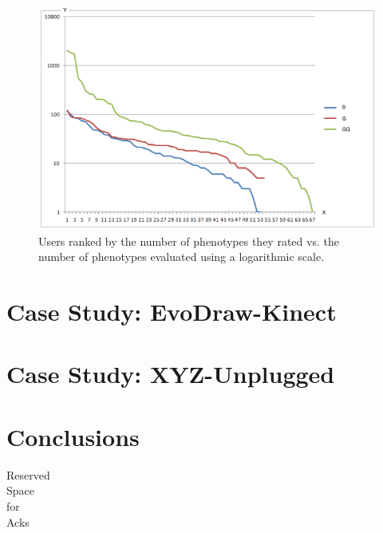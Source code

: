 \begin{figure}[!t]
    \centering
        \includegraphics[width=4.5in]{img/comparison.png}
    \caption{Users ranked by the number of phenotypes they rated vs. the number of phenotypes evaluated using a logarithmic scale. }
    \label{fig:top-ranked-participation}
\end{figure}

\section{Case Study: EvoDraw-Kinect}
\section{Case Study: XYZ-Unplugged}


\section{Conclusions}
\label{sec:conclusions}





\begin{acks}

  Reserved\\
  Space\\
  for\\
  Acks

\end{acks}
